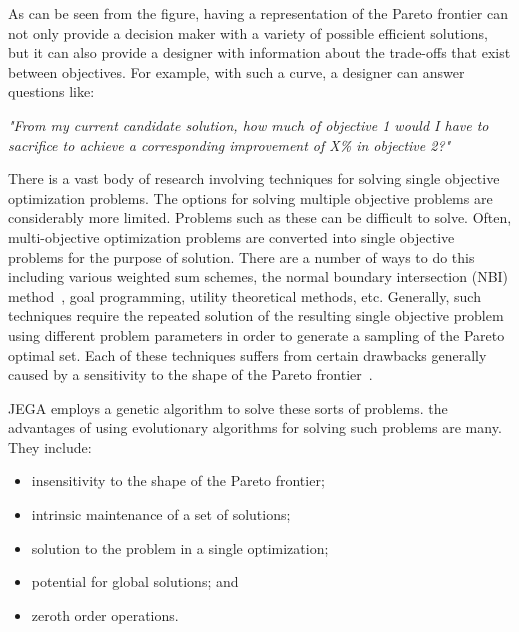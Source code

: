 As can be seen from the figure, having a representation of the
Pareto frontier can not only provide a decision maker with a variety
of possible efficient solutions, but it can also provide a designer
with information about the trade-offs that exist between objectives.
For example, with such a curve, a designer can answer questions
like:

\vspace{1em}
\begin{center}
\parbox{5in}{ \emph{"From my current candidate solution, how much of objective 1
would I have to sacrifice to achieve a corresponding improvement of
X\% in objective 2?"}}
\end{center}
\vspace{1em}

There is a vast body of research involving techniques for solving
single objective optimization problems.  The options for solving
multiple objective problems are considerably more limited.  Problems
such as these can be difficult to solve.  Often, multi-objective
optimization problems are converted into single objective problems
for the purpose of solution.  There are a number of ways to do this
including various weighted sum schemes, the normal boundary
intersection (NBI) method~\cite{das:nbi:1998}, goal programming,
utility theoretical methods, etc.  Generally, such techniques
require the repeated solution of the resulting single objective
problem using different problem parameters in order to generate a
sampling of the Pareto optimal set.  Each of these techniques
suffers from certain drawbacks generally caused by a sensitivity to
the shape of the Pareto frontier~\cite{dennis:weight_sum_drawbacks:1997}.

JEGA employs a genetic algorithm to solve these sorts of problems.
the advantages of using evolutionary algorithms for solving such
problems are many.  They include:


\begin{itemize}

\item insensitivity to the shape of the Pareto frontier;
\item intrinsic maintenance of a set of solutions;
\item solution to the problem in a single optimization;
\item potential for global solutions; and
\item zeroth order operations.

\end{itemize}


